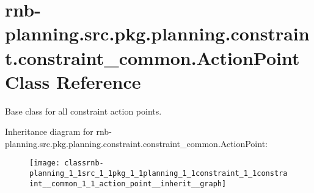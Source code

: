 \hypertarget{classrnb-planning_1_1src_1_1pkg_1_1planning_1_1constraint_1_1constraint__common_1_1_action_point}{}\section{rnb-\/planning.src.\+pkg.\+planning.\+constraint.\+constraint\+\_\+common.\+Action\+Point Class Reference}
\label{classrnb-planning_1_1src_1_1pkg_1_1planning_1_1constraint_1_1constraint__common_1_1_action_point}


Base class for all constraint action points.  




Inheritance diagram for rnb-\/planning.src.\+pkg.\+planning.\+constraint.\+constraint\+\_\+common.\+Action\+Point\+:\nopagebreak
\begin{figure}[H]
\begin{center}
\leavevmode
\texttt{[image: classrnb-planning\_1\_1src\_1\_1pkg\_1\_1planning\_1\_1constraint\_1\_1constraint\_\_common\_1\_1\_action\_point\_\_inherit\_\_graph]}
\end{center}
\end{figure}
